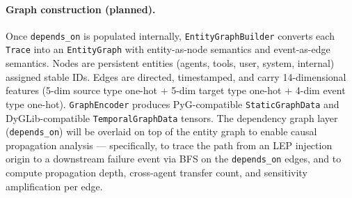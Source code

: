 \paragraph{Graph construction (planned).}
Once \texttt{depends\_on} is populated internally, \texttt{EntityGraphBuilder} converts each \texttt{Trace} into an \texttt{EntityGraph} with entity-as-node semantics and event-as-edge semantics. Nodes are persistent entities (agents, tools, user, system, internal) assigned stable IDs. Edges are directed, timestamped, and carry 14-dimensional features (5-dim source type one-hot + 5-dim target type one-hot + 4-dim event type one-hot). \texttt{GraphEncoder} produces PyG-compatible \texttt{StaticGraphData} and DyGLib-compatible \texttt{TemporalGraphData} tensors. The dependency graph layer (\texttt{depends\_on}) will be overlaid on top of the entity graph to enable causal propagation analysis — specifically, to trace the path from an LEP injection origin to a downstream failure event via BFS on the \texttt{depends\_on} edges, and to compute propagation depth, cross-agent transfer count, and sensitivity amplification per edge.

